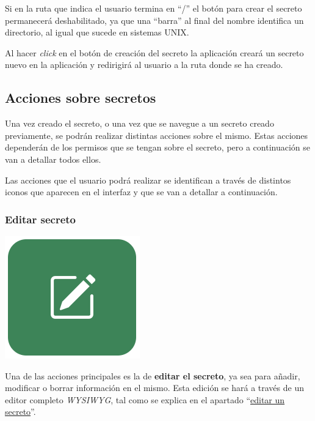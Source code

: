\documentclass{\ClassPath/viu-tfm-template}
\begin{document}
Si en la ruta que indica el usuario termina en “/” el botón para crear el secreto permanecerá deshabilitado, ya que una “barra” al final del nombre identifica un directorio, al igual que sucede en sistemas UNIX.

Al hacer \textit{click} en el botón de creación del secreto la aplicación creará un secreto nuevo en la aplicación y redirigirá al usuario a la ruta donde se ha creado.

\subsection{Acciones sobre secretos}

Una vez creado el secreto, o una vez que se navegue a un secreto creado previamente, se podrán realizar distintas acciones sobre el mismo. Estas acciones dependerán de los permisos que se tengan sobre el secreto, pero a continuación se van a detallar todos ellos.


Las acciones que el usuario podrá realizar se identifican a través de  distintos iconos que aparecen en el interfaz y que se van a detallar a continuación.


\subsubsection*{Editar secreto}
{
\begin{minipage}{0.1\linewidth}
    \includegraphics[width=\linewidth]{img/edit.png}
\end{minipage}
\hfill
\begin{minipage}{0.85\linewidth}
    Una de las acciones principales es la de \textbf{editar el secreto}, ya sea para añadir, modificar o borrar información en el mismo. Esta edición se hará a través de un editor completo \textit{WYSIWYG}, tal como se explica en el apartado “\hyperlink{editar_secreto}{editar un secreto}”.
\end{minipage}
}
\end{document}
